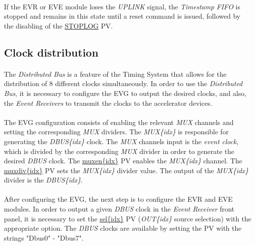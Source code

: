 \documentclass[openany]{article}
\begin{document}
		\paragraph{} If the EVR or EVE module loses the \emph{UPLINK} signal, the \emph{Timestamp FIFO} is stopped and remains in this state until a reset command is issued, followed by the disabling of the \hyperref[pvgroup:evre-timestamp-log]{STOPLOG} PV.

	\subsection{Clock distribution}
		\paragraph{} The \emph{Distributed Bus} is a feature of the Timing System that allows for the distribution of 8 different clocks simultaneously. In order to use the \emph{Distributed Bus}, it is necessary to configure the EVG to output the desired clocks, and also, the \emph{Event Receivers} to transmit the clocks to the accelerator devices.
		\paragraph{} The EVG configuration consists of enabling the relevant \emph{MUX} channels and setting the corresponding \emph{MUX} dividers. The \emph{MUX\{idx\}} is responsible for generating the \emph{DBUS\{idx\}} clock. The \emph{MUX} channels input is the \emph{event clock}, which is divided by the corresponding \emph{MUX} divider in order to generate the desired \emph{DBUS} clock. The \hyperref[pvgroup:evg-mux]{muxen\{idx\}} PV enables the \emph{MUX\{idx\}} channel. The \hyperref[pvgroup:evg-mux]{muxdiv\{idx\}} PV sets the \emph{MUX\{idx\}} divider value. The output of the \emph{MUX\{idx\}} divider is the \emph{DBUS\{idx\}}.
		\paragraph{} After configuring the EVG, the next step is to configure the EVR and EVE modules. In order to output a given \emph{DBUS} clock in the \emph{Event Receiver} front panel, it is necessary to set the \hyperref[pvgroup:evre-out]{sel\{idx\}} PV (\emph{OUT\{idx\}} source selection) with the appropriate option. The \emph{DBUS} clocks are available by setting the PV with the strings "Dbus0" - "Dbus7".
\end{document}
